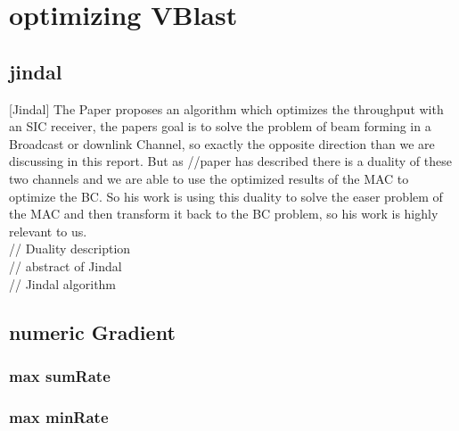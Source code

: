 \section{optimizing VBlast}
\subsection{jindal}
[Jindal]
The Paper proposes an algorithm which optimizes the throughput with an SIC receiver, the papers goal is to solve the problem of beam forming in a Broadcast or downlink Channel, so exactly the opposite direction than we are discussing in this report. But as //paper has described there is a duality of these two channels and we are able to use the optimized results of the MAC to optimize the BC. So his work is using this duality to solve the easer problem of the MAC and then transform it back to the BC problem, so his work is highly relevant to us.\\
// Duality description\\
// abstract of Jindal\\
// Jindal algorithm
\subsection{numeric Gradient}
\subsubsection{max sumRate}
\subsubsection{max minRate}

